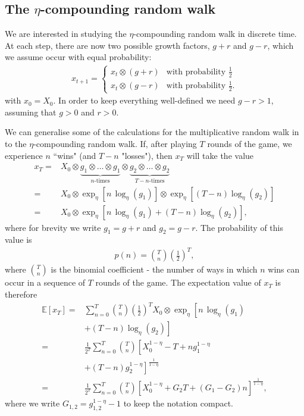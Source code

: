 \documentclass[11pt]{article}
\begin{document}
\begin{multicols}{2}
\section{The $\eta$-compounding random walk}
We are interested in studying the $\eta$-compounding random walk in discrete time. At each step, there are now two possible growth factors, $g+r$ and $g-r$, which  we assume occur with equal probability: 
\begin{align}
\label{eq-etaRandomWalk}
x_{t+1} = \left\{ 
\begin{array}{ll}
x_t \otimes \left(g +r \right) & \text{with probability $\frac{1}{2}$}\\
x_t \otimes \left(g - r \right)  & \text{with probability $\frac{1}{2}$}.
\end{array}
\right.
\end{align}
with $x_0 = X_0$.
In order to keep everything well-defined we need $g-r > 1$, assuming that $g>0$ and $r>0$.

We can generalise some of the calculations for the multiplicative random walk in \cite{redner1990random} to the $\eta$-compounding random walk.  
If, after playing $T$ rounds of the game, we experience $n$ ``wins" (and $T-n$ "losses"), then $x_T$ will take the value
\begin{align*}
x_T =  &X_0\otimes \underbrace{g_1\otimes \ldots \otimes g_1}_{n\text{-times}} \otimes \underbrace{g_2\otimes \ldots \otimes g_2}_{T-n\text{-times}} \\
=& X_0\otimes\exp_\eta\left[n\,\log_\eta(g_1)\right]\! \otimes \!\exp_\eta\left[(T\!-\!n) \log_\eta(g_2) \right]\\
=& X_0\otimes \exp_\eta\left[ n\,\log_\eta(g_1) + (T\!-\!n)\log_\eta(g_2) \right],
\end{align*}
where for brevity we write $g_1 = g+r$ and $g_2 = g-r$.
The probability of this value is
\begin{align}
\label{eq:binomialDistr}
p(n) = {T \choose n} \left(\frac{1}{2}\right)^T,
\end{align}
where ${T \choose n}$ is the binomial coefficient -  the number of ways in which $n$ wins can occur in a sequence of $T$ rounds of the game.
The expectation value of $x_T$ is therefore
\begin{align}
\nonumber \mathbb{E}\left[x_T \right] =& \sum_{n=0}^T  {T \choose n} \left(\frac{1}{2}\right)^T  X_0\otimes\exp_\eta\left[ n\,\log_\eta(g_1) \right.\\
\nonumber & \left. + (T-n)\log_\eta(g_2) \right]\\
\nonumber =&   \frac{1}{2^T} \sum_{n=0}^T  {T \choose n} \left[X_0^{1-\eta } -T + n g_1^{1-\eta }\right.\\
\nonumber &\left. + (T-n) g_2^{1-\eta }\right]^{\frac{1}{1-\eta }}\\
\label{eq-expectationxT} =&  \frac{1}{2^T} \sum_{n=0}^T  {T \choose n} \left[X_0^{1-\eta }  +G_2 T + (G_1-G_2) n \right]^{\frac{1}{1-\eta }},
\end{align}
where we write $G_{1,2} = g_{1,2}^{1-\eta}-1$  to keep the notation compact.


\end{multicols}
\end{document}
